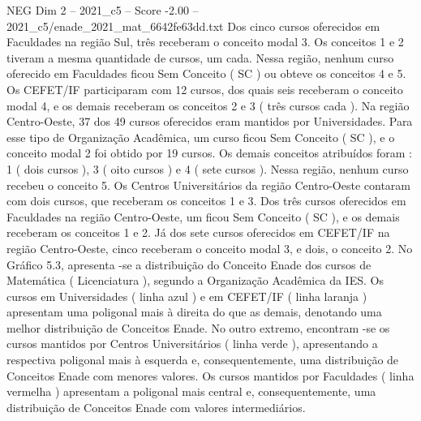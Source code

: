 \begin{textsample}{NEG Dim 2 – 2021\_c5 – Score -2.00 – 2021\_c5/enade\_2021\_mat\_6642fe63dd.txt}
Dos cinco cursos oferecidos em Faculdades na região Sul, três receberam o conceito modal 3.
Os conceitos 1 e 2 tiveram a mesma quantidade de cursos, um cada.
Nessa região, nenhum curso oferecido em Faculdades ficou Sem Conceito ( SC ) ou obteve os conceitos 4 e 5.
Os CEFET/IF participaram com 12 cursos, dos quais seis receberam o conceito modal 4, e os demais receberam os conceitos 2 e 3 ( três cursos cada ).
Na região Centro-Oeste, 37 dos 49 cursos oferecidos eram mantidos por Universidades.
Para esse tipo de Organização Acadêmica, um curso ficou Sem Conceito ( SC ), e o conceito modal 2 foi obtido por 19 cursos.
Os demais conceitos atribuídos foram : 1 ( dois cursos ), 3 ( oito cursos ) e 4 ( sete cursos ).
Nessa região, nenhum curso recebeu o conceito 5.
Os Centros Universitários da região Centro-Oeste contaram com dois cursos, que receberam os conceitos 1 e 3.
Dos três cursos oferecidos em Faculdades na região Centro-Oeste, um ficou Sem Conceito ( SC ), e os demais receberam os conceitos 1 e 2.
Já dos sete cursos oferecidos em CEFET/IF na região Centro-Oeste, cinco receberam o conceito modal 3, e dois, o conceito 2.
No Gráfico 5.3, apresenta -se a distribuição do Conceito Enade dos cursos de Matemática ( Licenciatura ), segundo a Organização Acadêmica da IES.
Os cursos em Universidades ( linha azul ) e em CEFET/IF ( linha laranja ) apresentam uma poligonal mais à direita do que as demais, denotando uma melhor distribuição de Conceitos Enade.
No outro extremo, encontram -se os cursos mantidos por Centros Universitários ( linha verde ), apresentando a respectiva poligonal mais à esquerda e, consequentemente, uma distribuição de Conceitos Enade com menores valores.
Os cursos mantidos por Faculdades ( linha vermelha ) apresentam a poligonal mais central e, consequentemente, uma distribuição de Conceitos Enade com valores intermediários.

\end{textsample}
